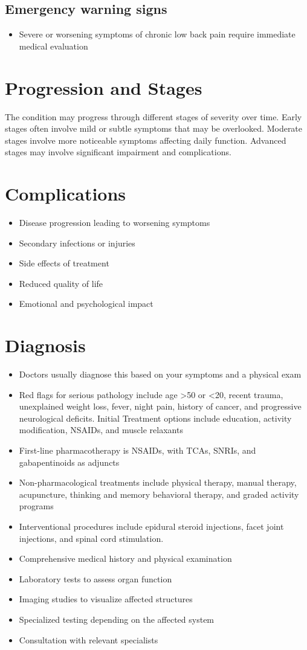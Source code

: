 \subsection{Emergency warning signs}
\begin{itemize}[noitemsep]
  \item Severe or worsening symptoms of chronic low back pain require immediate medical evaluation
\end{itemize}
\section{Progression and Stages}
The condition may progress through different stages of severity over time. Early stages often involve mild or subtle symptoms that may be overlooked. Moderate stages involve more noticeable symptoms affecting daily function. Advanced stages may involve significant impairment and complications.
\section{Complications}
\begin{itemize}[noitemsep]
  \item Disease progression leading to worsening symptoms
  \item Secondary infections or injuries
  \item Side effects of treatment
  \item Reduced quality of life
  \item Emotional and psychological impact
\end{itemize}
\section{Diagnosis}
\begin{itemize}[noitemsep]
  \item Doctors usually diagnose this based on your symptoms and a physical exam
  \item Red flags for serious pathology include age >50 or <20, recent trauma, unexplained weight loss, fever, night pain, history of cancer, and progressive neurological deficits. Initial Treatment options include education, activity modification, NSAIDs, and muscle relaxants
  \item First-line pharmacotherapy is NSAIDs, with TCAs, SNRIs, and gabapentinoids as adjuncts
  \item Non-pharmacological treatments include physical therapy, manual therapy, acupuncture, thinking and memory behavioral therapy, and graded activity programs
  \item Interventional procedures include epidural steroid injections, facet joint injections, and spinal cord stimulation.
  \item Comprehensive medical history and physical examination
  \item Laboratory tests to assess organ function
  \item Imaging studies to visualize affected structures
  \item Specialized testing depending on the affected system
  \item Consultation with relevant specialists
\end{itemize}
